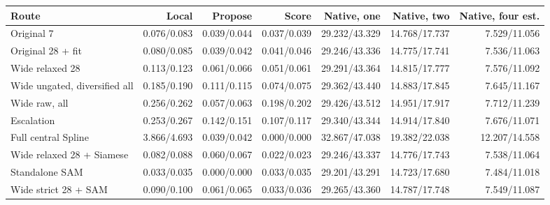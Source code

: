\begin{tabular}{lrrrrrr}
\toprule
Route & Local & Propose & Score & Native, one & Native, two & Native, four est. \\
\midrule
Original 7 & 0.076/0.083 & 0.039/0.044 & 0.037/0.039 & 29.232/43.329 & 14.768/17.737 & 7.529/11.056 \\
Original 28 + fit & 0.080/0.085 & 0.039/0.042 & 0.041/0.046 & 29.246/43.336 & 14.775/17.741 & 7.536/11.063 \\
Wide relaxed 28 & 0.113/0.123 & 0.061/0.066 & 0.051/0.061 & 29.291/43.364 & 14.815/17.777 & 7.576/11.092 \\
Wide ungated, diversified all & 0.185/0.190 & 0.111/0.115 & 0.074/0.075 & 29.362/43.440 & 14.883/17.845 & 7.645/11.167 \\
Wide raw, all & 0.256/0.262 & 0.057/0.063 & 0.198/0.202 & 29.426/43.512 & 14.951/17.917 & 7.712/11.239 \\
Escalation & 0.253/0.267 & 0.142/0.151 & 0.107/0.117 & 29.340/43.344 & 14.914/17.840 & 7.676/11.071 \\
Full central Spline & 3.866/4.693 & 0.039/0.042 & 0.000/0.000 & 32.867/47.038 & 19.382/22.038 & 12.207/14.558 \\
Wide relaxed 28 + Siamese & 0.082/0.088 & 0.060/0.067 & 0.022/0.023 & 29.246/43.337 & 14.776/17.743 & 7.538/11.064 \\
Standalone SAM & 0.033/0.035 & 0.000/0.000 & 0.033/0.035 & 29.201/43.291 & 14.723/17.680 & 7.484/11.018 \\
Wide strict 28 + SAM & 0.090/0.100 & 0.061/0.065 & 0.033/0.036 & 29.265/43.360 & 14.787/17.748 & 7.549/11.087 \\
\bottomrule
\end{tabular}
